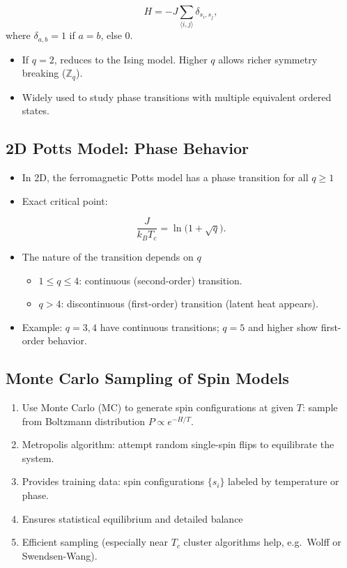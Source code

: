 \documentclass[%
oneside,                 %
final,                   %
10pt]{article}
\begin{document}
\noindent
     \[
       H = -J \sum_{\langle i,j\rangle} \delta_{s_i,s_j},
     \]
where $\delta_{a,b}=1$ if $a=b$, else $0$.
\begin{itemize}
\item If $q=2$, reduces to the Ising model. Higher $q$ allows richer symmetry breaking ($\mathbb{Z}_q$).

\item Widely used to study phase transitions with multiple equivalent ordered states.
\end{itemize}

\noindent
\subsection{2D Potts Model: Phase Behavior}
\begin{itemize}
\item In 2D, the ferromagnetic Potts model has a phase transition for all $q\ge1$ 

\item Exact critical point:
\end{itemize}

\noindent
     \[
       \frac{J}{k_B T_c} = \ln\!\bigl(1+\sqrt{q}\bigr).
     \]
\begin{itemize}
\item The nature of the transition depends on $q$ 
\begin{itemize}

  \item $1 \le q \le 4$: continuous (second-order) transition.

  \item $q > 4$: discontinuous (first-order) transition (latent heat appears).

\end{itemize}

\noindent
\item Example: $q=3,4$ have continuous transitions; $q=5$ and higher show first-order behavior.
\end{itemize}

\noindent
\subsection{Monte Carlo Sampling of Spin Models}
\begin{enumerate}
\item Use Monte Carlo (MC) to generate spin configurations at given $T$: sample from Boltzmann distribution $P\propto e^{-H/T}$.

\item Metropolis algorithm: attempt random single-spin flips to equilibrate the system.

\item Provides training data: spin configurations $\{s_i\}$ labeled by temperature or phase.

\item Ensures statistical equilibrium and detailed balance 

\item Efficient sampling (especially near $T_c$ cluster algorithms help, e.g.\ Wolff or Swendsen-Wang).
\end{enumerate}
\end{document}
